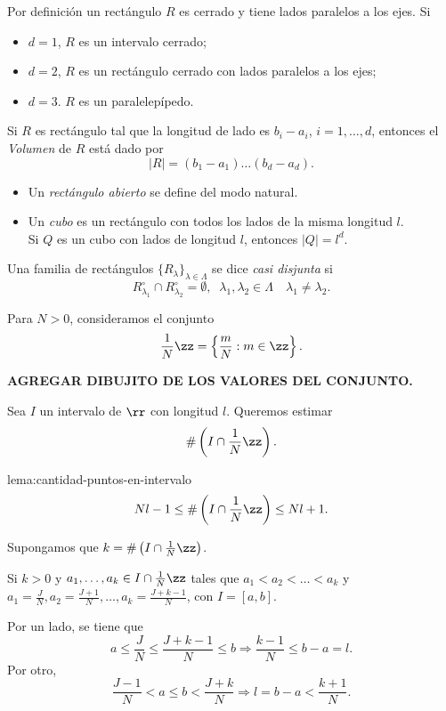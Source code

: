 \begin{observacion}{}
Por definici\'on un rect\'angulo $R$ es cerrado y tiene lados paralelos a los ejes. Si 
\begin{itemize}
    \item $d=1$, $R$ es un intervalo cerrado;
    \item $d=2$, $R$ es un rect\'angulo cerrado con lados paralelos a los ejes;
    \item $d=3$. $R$ es un paralelep\'ipedo.
\end{itemize}
\end{observacion}

Si $R$ es rect\'angulo tal que la longitud de lado es $b_i-a_i$, $i=1,\ldots,d$, entonces el \emph{Volumen} de $R$ est\'a dado por
\[
|R|=(b_1-a_1)\ldots(b_d-a_d).
\]

\begin{itemize}
    \item Un \emph{rect\'angulo abierto} se define del modo natural.
    \item Un \emph{cubo} es un rect\'angulo con todos los lados de la misma longitud $l$. \\
    Si $Q$ es un cubo con lados de longitud $l$, entonces $|Q|=l^d$.
\end{itemize}

Una familia de rect\'angulos $\{R_{\lambda}\}_{\lambda \in \Lambda}$ se dice \emph{casi disjunta} si 
\[
R_{\lambda_1}^{\circ} \cap R_{\lambda_2}^{\circ}=\emptyset, \;\; \lambda_1,\lambda_2 \in \Lambda\quad \lambda_1\neq\lambda_2 .
\]

Para $N>0$, consideramos el conjunto 
\[
\frac{1}{N}\zz=\left\{ \frac{m}{N}: m\in \zz   \right\}.
\]

\textbf{AGREGAR DIBUJITO DE LOS VALORES DEL CONJUNTO.}


Sea $I$ un intervalo de $\rr$ con longitud $l$. Queremos estimar 
\[
\# \left(I \cap \frac{1}{N}\zz \right).
\]

\begin{lema}{lema:cantidad-puntos-en-intervalo}
\[
Nl-1 \leq \# \left(I \cap \frac{1}{N}\zz \right) \leq Nl+1.\]
\end{lema}

\begin{demo}

Supongamos que $k=\# \left(I \cap \frac{1}{N}\zz \right)$.

Si $k>0$ y $a_1,\ldots,a_k \in I \cap \frac{1}{N}\zz$ tales que 
$a_1<a_2<\ldots<a_k$ y $a_1=\frac{J}{N},a_2=\frac{J+1}{N},\ldots,a_k=\frac{J+k-1}{N}$, con 
$I=[a,b]$. 

Por un lado, se tiene que
\[
a\leq \frac{J}{N}\leq \frac{J+k-1}{N}\leq b \Rightarrow
\frac{k-1}{N}\leq b-a=l.
\]
Por otro, 
\[
\frac{J-1}{N}< a\leq b<\frac{J+k}{N} \Rightarrow
l=b-a< \frac{k+1}{N}.
\]
\end{demo}

